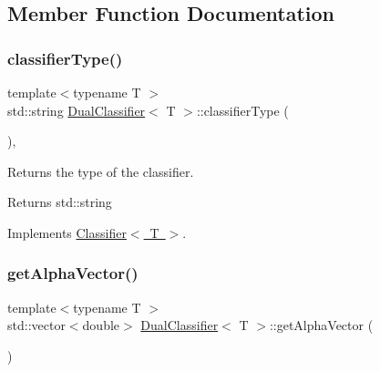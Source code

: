 \subsection{Member Function Documentation}
\mbox{\label{class_dual_classifier_af1217d4b44e417817a25157bb3f9b6d9}} 
\subsubsection{\texorpdfstring{classifier\+Type()}{classifierType()}}
{\footnotesize\ttfamily template$<$typename T $>$ \\
std\+::string \mbox{\hyperlink{class_dual_classifier}{Dual\+Classifier}}$<$ T $>$\+::classifier\+Type (\begin{DoxyParamCaption}{ }\end{DoxyParamCaption})\hspace{0.3cm}{\ttfamily [inline]}, {\ttfamily [virtual]}}



Returns the type of the classifier. 

\begin{DoxyReturn}{Returns}
std\+::string 
\end{DoxyReturn}


Implements \mbox{\hyperlink{class_classifier_ab40f42f957ec50939bd9a6b0cd5d1786}{Classifier$<$ T $>$}}.

\mbox{\label{class_dual_classifier_a9ce7228ddbdf6886782e2d1abf9bb0a9}} 
\subsubsection{\texorpdfstring{get\+Alpha\+Vector()}{getAlphaVector()}}
{\footnotesize\ttfamily template$<$typename T $>$ \\
std\+::vector$<$double$>$ \mbox{\hyperlink{class_dual_classifier}{Dual\+Classifier}}$<$ T $>$\+::get\+Alpha\+Vector (\begin{DoxyParamCaption}{ }\end{DoxyParamCaption})\hspace{0.3cm}{\ttfamily [inline]}}



